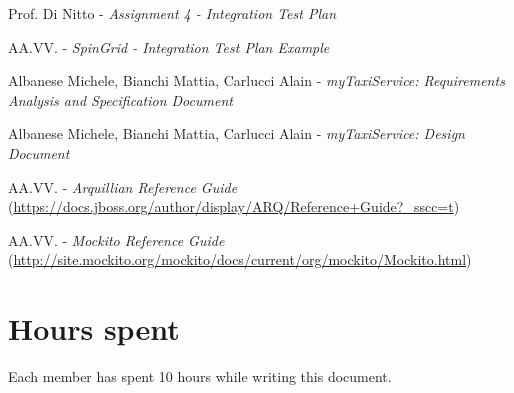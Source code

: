 \documentclass[a4paper, 12pt]{article}
\begin{document}
\begin{thebibliography}{9}
    Prof. Di Nitto - \emph{Assignment 4 - Integration Test Plan}

    AA.VV. - \emph{SpinGrid - Integration Test Plan Example}

        Albanese Michele, Bianchi Mattia, Carlucci Alain - \emph{myTaxiService: Requirements Analysis and Specification Document}

        Albanese Michele, Bianchi Mattia, Carlucci Alain - \emph{myTaxiService: Design Document}

        AA.VV. - \emph{Arquillian Reference Guide} {\small(\url{https://docs.jboss.org/author/display/ARQ/Reference+Guide?_sscc=t})}

        AA.VV. - \emph{Mockito Reference Guide} {\small(\url{http://site.mockito.org/mockito/docs/current/org/mockito/Mockito.html})}
\end{thebibliography}

\vfill

\section*{Hours spent}
Each member has spent 10 hours while writing this document.
\end{document}
